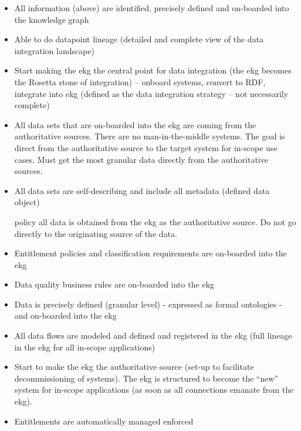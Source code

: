 \begin{itemize}[leftmargin=1.5in,font=\bfseries]
    \item All information (above) are identified, precisely defined and on-boarded into the knowledge graph
    \item Able to do datapoint lineage (detailed and complete view of the data integration landscape)
    \item Start making the \gls{ekg} the central point for data integration (the \gls{ekg} becomes the Rosetta stone of
          integration) -- onboard systems, convert to RDF, integrate into \gls{ekg} (defined as the
          data integration strategy -- not necessarily complete)
    \item All data sets that are on-boarded into the \gls{ekg} are coming from the authoritative sources.
          There are no man-in-the-middle systems.
          The goal is direct from the authoritative source to the target system for in-scope use cases.
          Must get the most granular data directly from the authoritative sources.
    \item All data sets are self-describing and include all metadata (defined data object)
    \item [policy] all data is obtained from the \gls{ekg} as the authoritative source.
          Do not go directly to the originating source of the data.
    \item Entitlement policies and classification requirements are on-boarded into the \gls{ekg}
    \item Data quality business rules are on-boarded into the \gls{ekg}

\end{itemize}

\kgmmscoringlevelThree

\begin{itemize}[leftmargin=1.5in,font=\bfseries]
    \item Data is precisely defined (granular level) - expressed as formal ontologies - and on-boarded into the \gls{ekg}
    \item All data flows are modeled and defined and registered in the \gls{ekg} (full lineage in the \gls{ekg} for all
          in-scope applications)
    \item Start to make the \gls{ekg} the authoritative source (set-up to facilitate decommissioning of systems).
          The \gls{ekg} is structured to become the “new” system for in-scope applications (as soon as all
          connections emanate from the \gls{ekg}).
    \item Entitlements are automatically managed enforced
\end{itemize}

